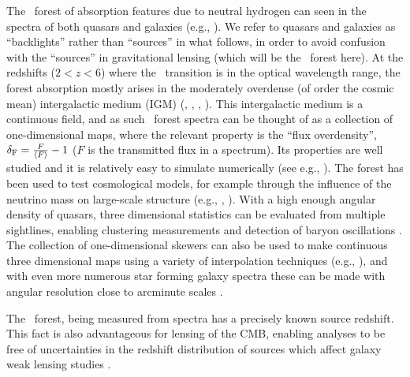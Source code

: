 The \lya\ forest of absorption features due to neutral hydrogen can
seen in the spectra of both quasars \cite{rauch1998} and galaxies (e.g.,
\cite{savaglio2002}).  We refer to quasars and galaxies as
``backlights'' rather than ``sources'' in what follows, in order to
avoid confusion with the ``sources'' in gravitational lensing (which
will be the \lya\ forest here). At the redshifts ($2 < z
< 6$) where the \lya\ transition is in the optical wavelength
range, the forest absorption mostly arises in the moderately overdense
(of order the cosmic mean) intergalactic medium (IGM) (\cite{bi1993}, 
\cite{cen1994}, \cite{zhang1995}, \cite{hernquist1996}).
  This intergalactic medium is a continuous field, and as such
\lya\ forest spectra can be thought of as a collection of
one-dimensional maps,
where the relevant property is the ``flux overdensity'', $\delta_{\rm F}=\frac{F}{\langle F \rangle} -1$ ($F$
is the transmitted flux in a spectrum).  Its properties are well
studied and it is relatively easy to simulate numerically (see e.g.,
\cite{bolton2017}). The forest has been used to test
cosmological models, for example through the influence of the neutrino
mass on large-scale structure (e.g., \cite{pal2015}, \cite{croft1999}).
  With a high enough angular
density of quasars, three dimensional statistics can be evaluated
from  multiple sightlines, enabling clustering
measurements and detection of baryon
oscillations \citep{busca2013}. The
collection of one-dimensional skewers can also be used to make
continuous three dimensional maps using a variety of interpolation
techniques (e.g., \cite{cisewski}), and
with even more numerous star forming galaxy spectra
these can be made with angular resolution close to arcminute scales
\citep{Lee2014}.

The \lya\ forest, being measured from spectra has a precisely known
source redshift. This fact is also advantageous for lensing of the
CMB, enabling analyses to be free of uncertainties in the redshift
distribution of sources which affect galaxy weak lensing studies
\citep{hearin2010}.

